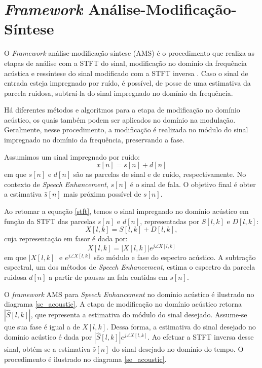 \section{\textit{Framework} Análise-Modificação-Síntese}
 
O \textit{Framework} análise-modificação-síntese (AMS) é o procedimento que
realiza as etapas de análise com a STFT do sinal, modificação no domínio da
frequência acústica e ressíntese do sinal modificado com a STFT
inversa \cite{paliwal2015}. Caso o sinal de entrada esteja
impregnado por ruído, é possível, de posse de uma estimativa da parcela ruidosa,
subtraí-la do sinal impregnado no domínio da frequência.

Há diferentes métodos e algoritmos para a etapa de modificação no domínio
acústico, os quais também podem ser aplicados no domínio na modulação.
Geralmente, nesse procedimento, a modificação é realizada no módulo do sinal
impregnado no domínio da frequência, preservando a fase.

Assumimos um sinal impregnado por ruído: 
\begin{equation}\label{chap_04:base}
    x[n] = s[n] + d[n]
\end{equation}
em que $s[n]$ e $d[n]$ são as parcelas de sinal e de ruído, respectivamente. No
contexto de \textit{Speech Enhancement}, $s[n]$ é o sinal de fala. O objetivo
final é obter a estimativa $\hat{s}[n]$ mais próxima possível de $s[n]$.

Ao retomar a equação \ref{stft}, temos o sinal impregnado no domínio acústico
em função da STFT das parcelas $s[n]$ e $d[n]$, representadas por $S[l, k]$ e
$D[l, k]$:
\begin{equation} \label{chap_3:stft_sum}
    X[l, k] = S[l, k] + D[l, k],
\end{equation}
cuja representação em fasor é dada por:
\begin{equation}
    X[l, k] = |X[l, k]| e^{j\angle{X[l, k]}}
\end{equation}
em que $|X[l, k]|$ e $e^{j\angle{X[l, k]}}$ são módulo e fase do espectro
acústico. A subtração espectral, um dos métodos de \textit{Speech Enhancement},
estima o espectro da parcela ruidosa $d[n]$ a partir de pausas na fala contidas
em $s[n]$.

O \textit{framework} AMS para \textit{Speech Enhancement} no domínio acústico é
ilustrado no diagrama \ref{se_acoustic}. A etapa de modificação no domínio
acústico retorna $|\hat{S}[l, k]|$, que representa a estimativa do módulo do
sinal desejado. Assume-se que sua fase é igual a de $X[l, k]$. Dessa forma, a
estimativa do sinal desejado no domínio acústico é dada por $|\hat{S}[l,
k]|e^{j\angle{X[l, k]}}$. Ao efetuar a STFT inversa desse sinal, obtém-se a
estimativa $\hat{s}[n]$ do sinal desejado no domínio do tempo. O procedimento é
ilustrado no diagrama \ref{se_acoustic}.

